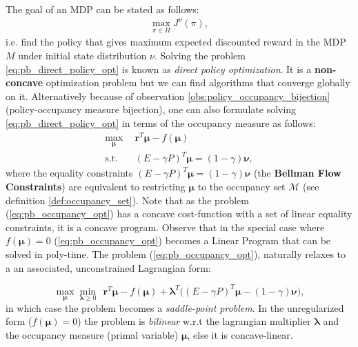 The goal of an MDP can be stated as follows:
\begin{align}
    \max_{\pi \in \Pi} J^\nu(\pi),
    \label{eq:pb_direct_policy_opt}
\end{align}
i.e. find the policy that gives maximum expected discounted reward in the MDP $\textit{M}$ under initial state distribution $\nu$. Solving the problem \ref{eq:pb_direct_policy_opt} is known as \textit{direct policy optimization}. It is a \textbf{non-concave} optimization problem but we can find algorithms that converge globally on it. Alternatively because of observation \ref{obs:policy_occupancy_bijection} (policy-occupancy measure bijection), one can also formulate solving \ref{eq:pb_direct_policy_opt} in terms of the occupancy measure as follows:
\begin{equation}
    \begin{aligned}
        \max_{\bm{\mu}} & ~~ \bm{r}^T\bm{\bm{\mu}} - f(\bm{\mu})\\
        \text{s.t.} & ~~  (E-\gamma P)^T  \bm{\mu} = (1-\gamma) \bm{\nu},
    \end{aligned}
    \label{eq:pb_occupancy_opt}
\end{equation}
where the equality constraints $ (E-\gamma P)^T  \bm{\mu} = (1-\gamma) \bm{\nu}$ (the \textbf{Bellman Flow Constraints}) are equivalent to restricting $\bm{\mu}$ to the occupancy set $\mathcal{M}$ (see definition \ref{def:occupancy_set}). Note that as the problem (\ref{eq:pb_occupancy_opt}) has a concave cost-function with a set of linear equality constraints, it is a concave program. Observe that in the special case where $f(\bm{\mu})=0$ (\ref{eq:pb_occupancy_opt}) becomes a Linear Program that can be solved in poly-time. The problem (\ref{eq:pb_occupancy_opt}), naturally relaxes to a an associated, unconstrained Lagrangian form:

\begin{equation}
    \max_{\bm{\mu}} \min_{\bm{\lambda} \geq 0 }~~ \bm{r}^T\bm{\bm{\mu}} - f(\bm{\mu}) + \bm{\lambda}^T \big((E-\gamma P)^T  \bm{\mu} - (1-\gamma) \bm{\nu} \big),
    \label{eq:pb_occupancy_lagrangian_opt}
\end{equation}
in which case the problem becomes a \textit{saddle-point problem}. In the unregularized form ($f(\bm{\mu})=0$) the problem is \textit{bilinear} w.r.t the lagrangian multiplier $\bm{\lambda}$ and the occupancy measure (primal variable) $\bm{\mu}$, else it is concave-linear.